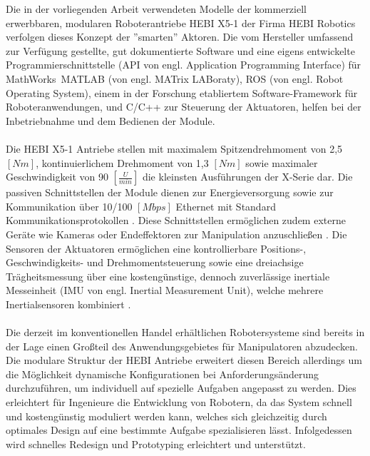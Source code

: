 \documentclass[Bachelor, BMR, ngerman]{twbook}
\begin{document}
    Die in der vorliegenden Arbeit verwendeten Modelle der kommerziell erwerbbaren, modularen Roboterantriebe HEBI X5-1 der Firma HEBI Robotics verfolgen dieses Konzept der ''smarten'' Aktoren. Die vom Hersteller umfassend zur Verfügung gestellte, gut dokumentierte Software und eine eigens entwickelte Programmierschnittstelle (API von engl. Application Programming Interface) für MathWorks\textregistered\ MATLAB (von engl. MATrix LABoraty), ROS (von engl. Robot Operating System), einem in der Forschung etabliertem Software-Framework für Roboteranwendungen, und C/C++ zur Steuerung der Aktuatoren, helfen bei der Inbetriebnahme und dem Bedienen der Module. \\ %
    \\
    Die HEBI X5-1 Antriebe stellen mit maximalem Spitzendrehmoment von 2,5 $[Nm]$, kontinuierlichem Drehmoment von 1,3 $[Nm]$ sowie maximaler Geschwindigkeit von 90 $[\frac{U}{min}]$ die kleinsten Ausführungen der X-Serie dar. Die passiven Schnittstellen der Module dienen zur Energieversorgung sowie zur Kommunikation über 10/100 $[Mbps]$ Ethernet mit Standard Kommunikationsprotokollen \cite{He18}. Diese Schnittstellen ermöglichen zudem externe Geräte wie Kameras oder Endeffektoren zur Manipulation anzuschließen \cite{AnWh17}. Die Sensoren der Aktuatoren ermöglichen eine kontrollierbare Positions-, Geschwindigkeits- und Drehmomentsteuerung sowie eine dreiachsige Trägheitsmessung über eine kostengünstige, dennoch zuverlässige inertiale Messeinheit (IMU von engl. Inertial Measurement Unit), welche mehrere Inertialsensoren kombiniert \cite{He18}.\\
    \\
    Die derzeit im konventionellen Handel erhältlichen Robotersysteme sind bereits in der Lage einen Großteil des Anwendungsgebietes für Manipulatoren abzudecken. Die modulare Struktur der HEBI Antriebe erweitert diesen Bereich allerdings um die Möglichkeit dynamische Konfigurationen bei Anforderungsänderung durchzuführen, um individuell auf spezielle Aufgaben angepasst zu werden. Dies erleichtert für Ingenieure die Entwicklung von Robotern, da das System schnell und kostengünstig moduliert werden kann, welches sich gleichzeitig durch optimales Design auf eine bestimmte Aufgabe spezialisieren lässt. Infolgedessen wird schnelles Redesign und Prototyping erleichtert und unterstützt.\\
\end{document}
